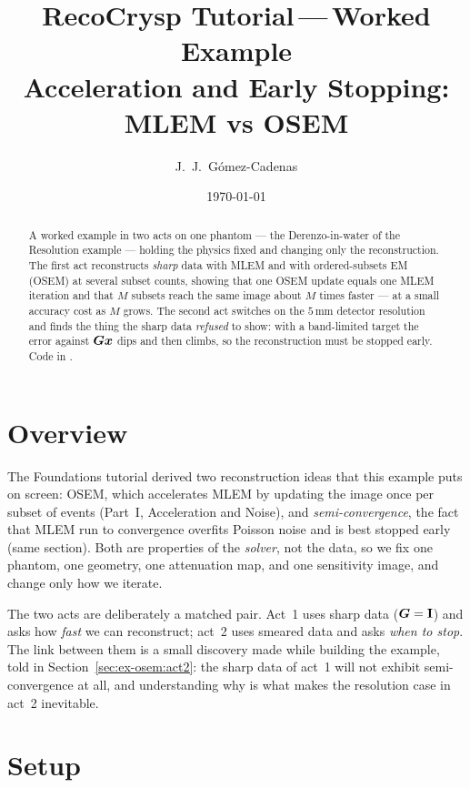 \documentclass[11pt,a4paper]{article}
\title{RecoCrysp Tutorial\,---\,Worked Example\\[2pt]
       \large Acceleration and Early Stopping: MLEM vs OSEM}
\author{J.~J.~G\'omez-Cadenas}
\date{\today}
\begin{document}
\maketitle

\begin{abstract}
A worked example in two acts on one phantom --- the Derenzo-in-water of the
Resolution example --- holding the physics fixed and changing only the
reconstruction. The first act reconstructs \emph{sharp} data with MLEM and with
ordered-subsets EM (OSEM) at several subset counts, showing that one OSEM update
equals one MLEM iteration and that $M$ subsets reach the same image about $M$
times faster --- at a small accuracy cost as $M$ grows. The second act switches on
the $5\,\mathrm{mm}$ detector resolution and finds the thing the sharp data
\emph{refused} to show: with a band-limited target the error against $\bm{G}\bm{x}$
dips and then climbs, so the reconstruction must be stopped early. Code in
.
\end{abstract}

\section{Overview}
\label{sec:ex-osem:overview}

The Foundations tutorial derived two reconstruction ideas that this example puts
on screen: OSEM, which accelerates MLEM by updating the image once per subset of
events (Part~I, Acceleration and Noise), and \emph{semi-convergence}, the fact
that MLEM run to convergence overfits Poisson noise and is best stopped early
(same section). Both are properties of the \emph{solver}, not the data, so we fix
one phantom, one geometry, one attenuation map, and one sensitivity image, and
change only how we iterate.

The two acts are deliberately a matched pair. Act~1 uses sharp data ($\bm{G}=\mathbf
I$) and asks how \emph{fast} we can reconstruct; act~2 uses smeared data and asks
\emph{when to stop}. The link between them is a small discovery made while
building the example, told in Section~\ref{sec:ex-osem:act2}: the sharp data of
act~1 will not exhibit semi-convergence at all, and understanding why is what
makes the resolution case in act~2 inevitable.

\section{Setup}
\label{sec:ex-osem:setup}
\end{document}
